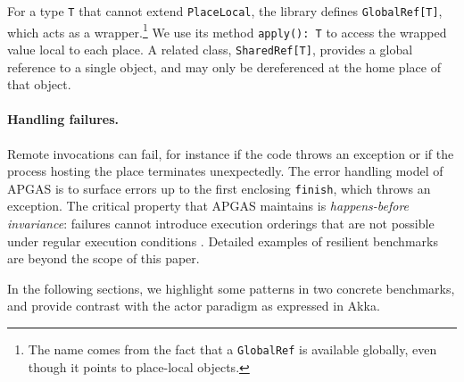 For a type \lstinline{T} that cannot extend \lstinline{PlaceLocal}, the library
defines \lstinline{GlobalRef[T]}, which acts as a wrapper.\footnote{The name
comes from the fact that a \lstinline{GlobalRef} is available globally,
even though it points to place-local objects.}
We use its method \lstinline{apply(): T} to access the
wrapped value local to each place.
A related class, \lstinline{SharedRef[T]}, provides a global reference to a single object, and may only be dereferenced at the home place of that object.

\paragraph{Handling failures.} Remote invocations can fail, for instance if the
code throws an exception or if the process hosting the place terminates
unexpectedly. The error handling model of APGAS is to surface errors up to the
first enclosing \lstinline{finish}, which throws an exception. The critical
property that APGAS maintains is \emph{happens-before invariance}: failures
cannot introduce execution orderings that are not possible under regular
execution conditions \cite{ppopp14,ecoop14}. Detailed examples of resilient
benchmarks are beyond the scope of this paper.

% 
% 
% 
% 
% 
% 
In the following sections, we highlight some \apgas patterns in two concrete
benchmarks, and provide contrast with the actor paradigm as expressed in Akka.
